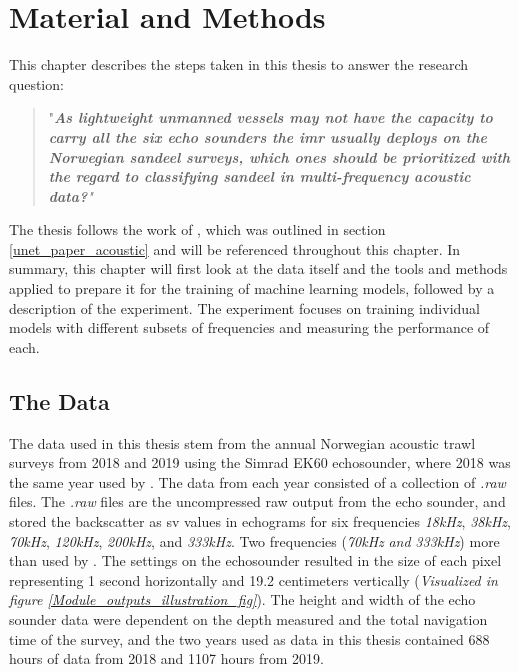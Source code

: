 \chapter{Material and Methods} \label{methods}
    This chapter describes the steps taken in this thesis to answer the research question:
        \begin{quote}
        "\textit{\textbf{As lightweight unmanned vessels may not have the capacity to carry all the six echo sounders the \gls{imr} usually deploys on the Norwegian sandeel surveys, which ones should be prioritized with the regard to classifying sandeel in multi-frequency acoustic data?}"}
        \end{quote}
    
    The thesis follows the work of \citeauthor{brautaset2020acoustic} \cite{brautaset2020acoustic}, which was outlined in section \ref{unet_paper_acoustic} and will be referenced throughout this chapter. In summary, this chapter will first look at the data itself and the tools and methods applied to prepare it for the training of machine learning models, followed by a description of the experiment. The experiment focuses on training individual models with different subsets of frequencies and measuring the performance of each.
    
    
    
    
    \section{The Data}
        The data used in this thesis stem from the annual Norwegian acoustic trawl surveys from 2018 and 2019 using the Simrad EK60 echosounder, where 2018 was the same year used by \citet{brautaset2020acoustic}. The data from each year consisted of a collection of \textit{.raw} files. The \textit{.raw} files are the uncompressed raw output from the echo sounder, and stored the backscatter as \gls{sv} values in echograms for six frequencies \textit{18kHz}, \textit{38kHz}, \textit{70kHz}, \textit{120kHz}, \textit{200kHz}, and \textit{333kHz}. Two frequencies (\textit{70kHz} \textit{and} \textit{333kHz}) more than used by \citet{brautaset2020acoustic} . The settings on the echosounder resulted in the size of each pixel representing 1 second horizontally and 19.2 centimeters vertically \cite{choi2021semi} (\textit{Visualized in figure \ref{Module_outputs_illustration_fig}}). The height and width of the echo sounder data were dependent on the depth measured and the total navigation time of the survey, and the two years used as data in this thesis contained 688 hours of data from 2018 and 1107 hours from 2019.
        
